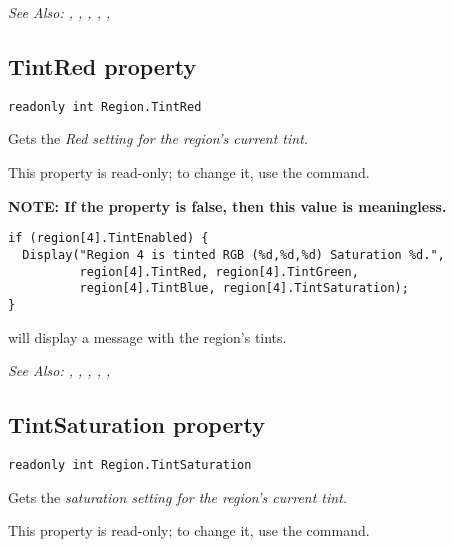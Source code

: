 \it{See Also:} , ,
, ,
, 


\subsection{TintRed property}\label{Region.TintRed}%

\begin{verbatim}
readonly int Region.TintRed
\end{verbatim}
Gets the \it{Red} setting for the region's current tint.

This property is read-only; to change it, use the  command.

\bf{NOTE:} If the  property is false, then
this value is meaningless.

\begin{verbatim}
if (region[4].TintEnabled) {
  Display("Region 4 is tinted RGB (%d,%d,%d) Saturation %d.",
          region[4].TintRed, region[4].TintGreen,
          region[4].TintBlue, region[4].TintSaturation);
}
\end{verbatim}
will display a message with the region's tints.

\it{See Also:} , ,
, ,
, 


\subsection{TintSaturation property}\label{Region.TintSaturation}%

\begin{verbatim}
readonly int Region.TintSaturation
\end{verbatim}
Gets the \it{saturation} setting for the region's current tint.

This property is read-only; to change it, use the  command.

